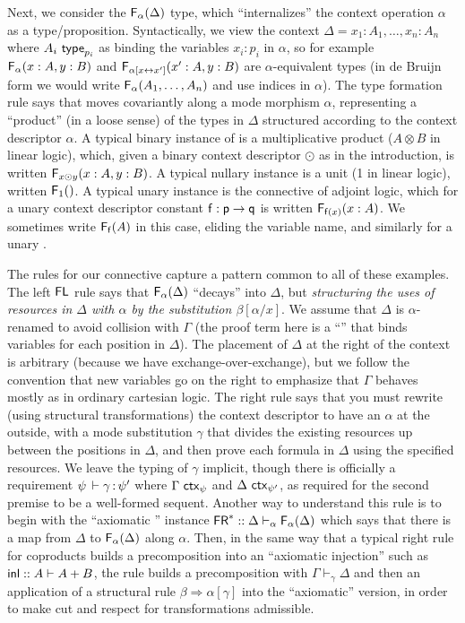 \documentclass[a4paper,USenglish]{lipics-v2016}
\newcommand\spr{\ensuremath{\Rightarrow}} %
\newcommand\seq[3]{\ensuremath{#1 \vdash_{#2} #3}}
\newcommand\F[2]{\ensuremath{\dsd{F}_{#1}(#2)}}
\renewcommand\subst[3]{\ensuremath{#1[#2/#3]}}
\newcommand\wftype[2]{\ensuremath{#1 \,\, \dsd{type}_{#2}}}
\renewcommand\wfctx[2]{\ensuremath{#1 \,\, \dsd{ctx}_{#2}}}
\renewcommand{\oftp}[3]{\ensuremath{#1 \, \vdash #2 \, \dcd{:} \, #3}}
\newcommand\FL{\dsd{FL}}
\newcommand\FR{\dsd{FR}}
\begin{document}
Next, we consider the \F{\alpha}{\Delta} type, which ``internalizes''
the context operation $\alpha$ as a type/proposition.  Syntactically, we
view the context $\Delta = x_1:A_1,\ldots,x_n:A_n$ where
\wftype{A_i}{p_i} as binding the variables $x_i:p_i$ in $\alpha$, so for
example \F{\alpha}{x:A,y:B} and \F{\alpha[x \leftrightarrow
    x']}{x':A,y:B} are $\alpha$-equivalent types (in de Bruijn form we
would write \F{\alpha}{A_1,\ldots,A_n} and use indices in $\alpha$).
The type formation rule says that  moves covariantly along a mode
morphism $\alpha$, representing a ``product'' (in a loose sense) of the
types in $\Delta$ structured according to the context descriptor
$\alpha$. A typical binary instance of  is a multiplicative
product ($A \otimes B$ in linear logic), which, given a binary context
descriptor $\odot$ as in the introduction, is written \F{x \odot
  y}{x:A,y:B}.  A typical nullary instance is a unit (1 in linear
logic), written \F{1}{}.  A typical unary instance is the 
connective of adjoint logic, which for a unary context descriptor
constant $\mathsf{f} : \mathsf{p} \to \mathsf{q}$ is written \F{\dsd{f}(x)}{x:A}.
We sometimes write \F{\dsd{f}}{A} in this case, eliding the variable
name, and similarly for a unary .

The rules for our  connective capture a pattern common to all of
these examples.  The left $\FL$ rule says that \F{\alpha}{\Delta}
``decays'' into $\Delta$, but \emph{structuring the uses of resources in
  $\Delta$ with $\alpha$ by the substitution \subst{\beta}{\alpha}{x}}.
We assume that $\Delta$ is $\alpha$-renamed to avoid collision with
$\Gamma$ (the proof term here is a ``'' that binds
variables for each position in $\Delta$).  The placement of $\Delta$ at
the right of the context is arbitrary (because we have
exchange-over-exchange), but we follow the convention that new variables
go on the right to emphasize that $\Gamma$ behaves mostly as in ordinary
cartesian logic.  The right \FR\/ rule says that you must rewrite (using
structural transformations) the context descriptor to have an $\alpha$
at the outside, with a mode substitution $\gamma$ that divides the
existing resources up between the positions in $\Delta$, and then prove
each formula in $\Delta$ using the specified resources.  We leave the
typing of $\gamma$ implicit, though there is officially a requirement
$\oftp{\psi}{\gamma}{\psi'}$ where $\wfctx{\Gamma}{\psi}$ and
$\wfctx{\Delta}{\psi'}$, as required for the second premise to be a
well-formed sequent.  Another way to understand this rule is to begin
with the ``axiomatic \FR'' instance 
$\FR^* :: {\seq{\Delta}{\alpha}{\F{\alpha}{\Delta}}}{}$
which says that there is a map from $\Delta$ to \F{\alpha}{\Delta} along
$\alpha$.  Then, in the same way that a typical right rule for
coproducts builds a precomposition into an ``axiomatic injection'' such
as $\mathsf{inl} :: A \vdash A + B$, the \FR\/ rule builds a precomposition
with $\seq{\Gamma}{\gamma}{\Delta}$ and then an application of a
structural rule $\beta \spr \alpha[\gamma]$ into the ``axiomatic''
version, in order to make cut and respect for transformations
admissible.
\end{document}

